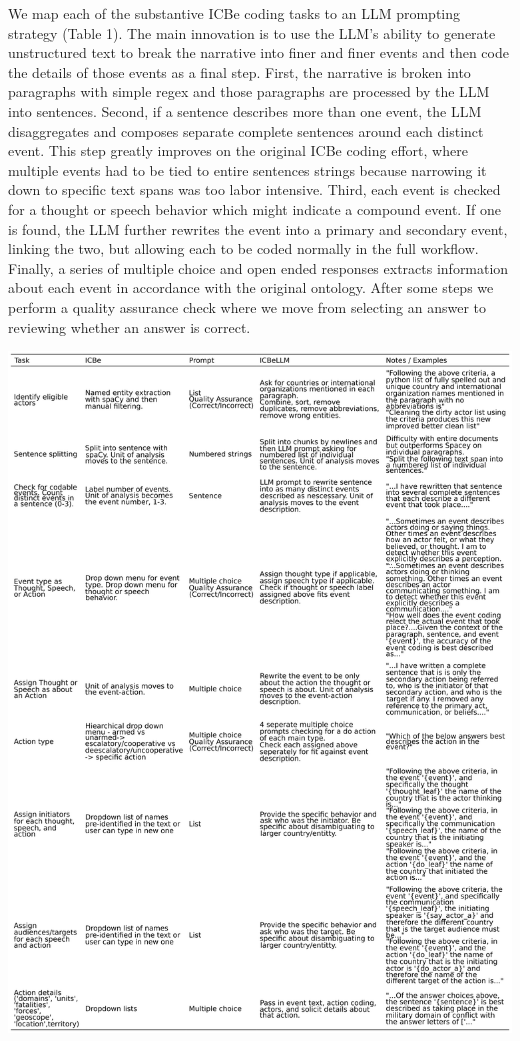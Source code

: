 \documentclass[
]{article}
\begin{document}
We map each of the substantive ICBe coding tasks to an LLM prompting
strategy (Table 1). The main innovation is to use the LLM's ability to
generate unstructured text to break the narrative into finer and finer
events and then code the details of those events as a final step. First,
the narrative is broken into paragraphs with simple regex and those
paragraphs are processed by the LLM into sentences. Second, if a
sentence describes more than one event, the LLM disaggregates and
composes separate complete sentences around each distinct event. This
step greatly improves on the original ICBe coding effort, where multiple
events had to be tied to entire sentences strings because narrowing it
down to specific text spans was too labor intensive. Third, each event
is checked for a thought or speech behavior which might indicate a
compound event. If one is found, the LLM further rewrites the event into
a primary and secondary event, linking the two, but allowing each to be
coded normally in the full workflow. Finally, a series of multiple
choice and open ended responses extracts information about each event in
accordance with the original ontology. After some steps we perform a
quality assurance check where we move from selecting an answer to
reviewing whether an answer is correct.

\includegraphics{Table1.png}
\end{document}
